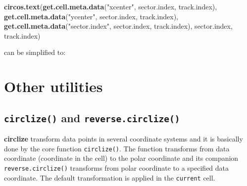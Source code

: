 \documentclass[]{book}
\newenvironment{Shaded}{\begin{snugshade}}{\end{snugshade}}
\newcommand{\KeywordTok}[1]{\textcolor[rgb]{0.13,0.29,0.53}{\textbf{#1}}}
\newcommand{\StringTok}[1]{\textcolor[rgb]{0.31,0.60,0.02}{#1}}
\newcommand{\CommentTok}[1]{\textcolor[rgb]{0.56,0.35,0.01}{\textit{#1}}}
\newcommand{\OperatorTok}[1]{\textcolor[rgb]{0.81,0.36,0.00}{\textbf{#1}}}
\newcommand{\NormalTok}[1]{#1}
\theoremstyle{definition}
\theoremstyle{definition}
\theoremstyle{remark}
\begin{document}
\begin{Shaded}
\begin{Highlighting}[]
\KeywordTok{circos.text}\NormalTok{(}\KeywordTok{get.cell.meta.data}\NormalTok{(}\StringTok{"xcenter"}\NormalTok{, sector.index, track.index),}
            \KeywordTok{get.cell.meta.data}\NormalTok{(}\StringTok{"ycenter"}\NormalTok{, sector.index, track.index),}
            \KeywordTok{get.cell.meta.data}\NormalTok{(}\StringTok{"sector.index"}\NormalTok{, sector.index, track.index),}
\NormalTok{            sector.index, track.index)}
\end{Highlighting}
\end{Shaded}

can be simplified to:

\begin{Shaded}
\end{Shaded}

\section{Other utilities}\label{other-utilities}

\subsection{\texorpdfstring{\texttt{circlize()} and
\texttt{reverse.circlize()}}{circlize() and reverse.circlize()}}\label{circlize_and_reverse_circlize}

\textbf{circlize} transform data points in several coordinate systems
and it is basically done by the core function \texttt{circlize()}. The
function transforms from data coordinate (coordinate in the cell) to the
polar coordinate and its companion \texttt{reverse.circlize()}
transforms from polar coordinate to a specified data coordinate. The
default transformation is applied in the \texttt{current} cell.
\end{document}
